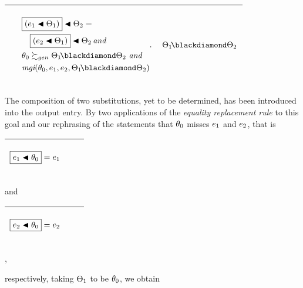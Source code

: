 \documentclass[runningheads]{llncs}
\DeclareMathOperator{\uand}{\emph{and}\,}
\DeclareMathOperator{\mgi}{\emph{mgi}}
\begin{document}
\begin{center}
\begin{tabular}{|m{}|m{}||m{}|}
 \hline 
  &\begin{center} 
$
\begin{aligned}
&\begin{aligned}&\boxed{(\e{1} \apply \Thet{1})} \apply \Thet{2} = \\ 
                &\quad \boxed{(\e{2} \apply \Thet{1})} \apply \Thet{2} \uand \end{aligned}   \\
 \,\, & \thet{0} \moregen \Thet{1}\! \compose \Thet{2} \, \uand
\\
  \,\, & {\mgi}(\thet{0}, \e{1}, \e{2}, \Thet{1}\! \compose \Thet{2})
\end{aligned}.$
\end{center}
& 
\begin{center}$\Thet{1}\! \compose \Thet{2}$ \end{center}\\
\hline
\end{tabular}
\end{center}                                                                                                     The composition of two substitutions, yet to be determined, has been introduced into the output entry. By two applications of the \emph{equality replacement rule}  to this goal and our rephrasing of the statements that $\theta_{0}$ misses $e_{1}$ and $e_{2}$, that is
\begin{center}
  \begin{tabular}{|m{}|m{}||m{}|}
\hline
\begin{center}
{$\boxed{e_{1} \blacktriangleleft \theta_{0}}= e_{1} $}\hspace{1cm} 
 \hspace{1cm} 
\end{center}& &  \\  \hline
\end{tabular}
\end{center}
and
\begin{center}
  \begin{tabular}{|m{}|m{}||m{}|}
\hline
\begin{center}
{$\boxed{e_{2} \blacktriangleleft \theta_{0}}= e_{2} $}\hspace{1cm} 
 \hspace{1cm} 
\end{center}& &  \\  \hline
\end{tabular},
\end{center}
respectively, taking $\Theta_{1}$ to be $\theta_{0}$, we obtain
\end{document}
